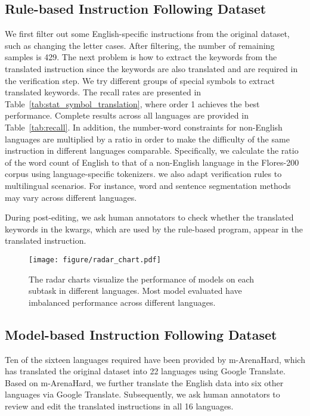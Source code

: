 \subsection{Rule-based Instruction Following Dataset}
We first filter out some English-specific instructions from the original dataset, such as changing the letter cases.
After filtering, the number of remaining samples is 429.
The next problem is how to extract the keywords from the translated instruction since the keywords are also translated and are required in the verification step.
We try different groups of special symbols to extract translated keywords.
The recall rates are presented in Table~\ref{tab:stat_symbol_translation}, where order 1 achieves the best performance.
Complete results across all languages are provided in Table~\ref{tab:recall}.
In addition, the number-word constraints for non-English languages are multiplied by a ratio in order to make the difficulty of the same instruction in different languages comparable.
Specifically, we calculate the ratio of the word count of English to that of a non-English language in the Flores-200 corpus using language-specific tokenizers.
we also adapt verification rules to multilingual scenarios.
For instance, word and sentence segmentation methods may vary across different languages.

During post-editing, we ask human annotators to check whether the translated keywords in the kwargs, which are used by the rule-based program, appear in the translated instruction.


\begin{figure*}[!t]
    \vskip 0.2in
    \centering
    \texttt{[image: figure/radar\_chart.pdf]}
    \caption{The radar charts visualize the performance of models on each subtask in different languages. Most model evaluated have imbalanced performance across different languages.}
    \label{fig:radar_chart}
    \vskip -0.2in
\end{figure*}


\subsection{Model-based Instruction Following Dataset}
Ten of the sixteen languages required have been provided by m-ArenaHard, which has translated the original dataset into 22 languages using Google Translate.
Based on m-ArenaHard, we further translate the English data into six other languages via Google Translate.
Subsequently, we ask human annotators to review and edit the translated instructions in all 16 languages.

